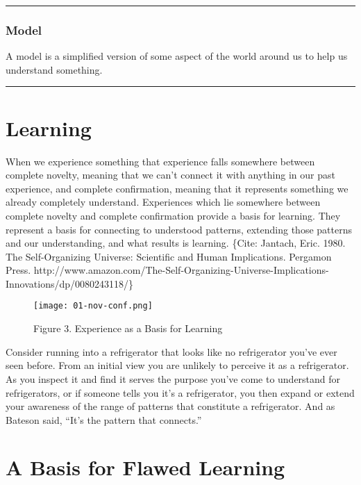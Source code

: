 \documentclass[]{memoir}
\let\Oldincludegraphics\includegraphics
\renewcommand{\includegraphics}[1]{\Oldincludegraphics[max size={\textwidth}{\textheight}]{#1}}
\begin{document}
\begin{center}\rule{3in}{0.4pt}\end{center}

\subsubsection{Model}

A model is a simplified version of some aspect of the world around us to
help us understand something.

\begin{center}\rule{3in}{0.4pt}\end{center}

\section{Learning}

When we experience something that experience falls somewhere between
complete novelty, meaning that we can't connect it with anything in our
past experience, and complete confirmation, meaning that it represents
something we already completely understand. Experiences which lie
somewhere between complete novelty and complete confirmation provide a
basis for learning. They represent a basis for connecting to understood
patterns, extending those patterns and our understanding, and what
results is learning. \{Cite: Jantach, Eric. 1980. The Self-Organizing
Universe: Scientific and Human Implications. Pergamon Press.
http://www.amazon.com/The-Self-Organizing-Universe-Implications-Innovations/dp/0080243118/\}

\begin{figure}[htbp]
\centering
\texttt{[image: 01-nov-conf.png]}
\caption{Figure 3. Experience as a Basis for Learning}
\end{figure}

Consider running into a refrigerator that looks like no refrigerator
you've ever seen before. From an initial view you are unlikely to
perceive it as a refrigerator. As you inspect it and find it serves the
purpose you've come to understand for refrigerators, or if someone tells
you it's a refrigerator, you then expand or extend your awareness of the
range of patterns that constitute a refrigerator. And as Bateson said,
``It's the pattern that connects.''

\section{A Basis for Flawed Learning}
\end{document}
